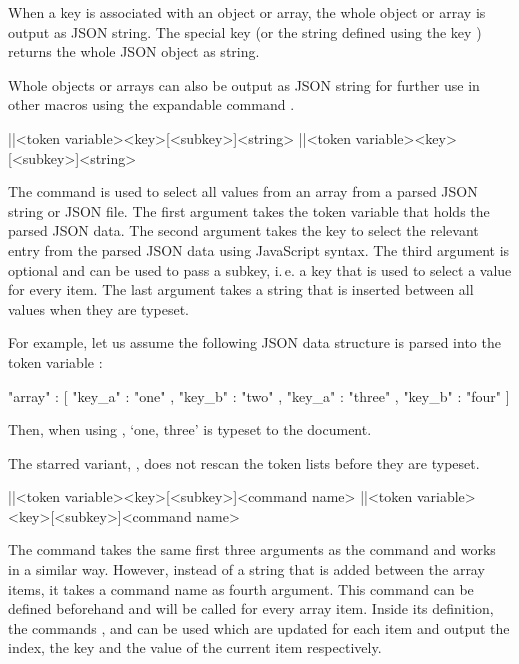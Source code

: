 \documentclass[a4paper]{article}
\begin{document}
{{When a key is associated with an object or array, the whole object or array is output as JSON string. The special key  (or the string defined using the key ) returns the whole JSON object as string. 

Whole objects or arrays can also be output as JSON string for further use in other macros using the expandable command \macro{\JSONParseExpandableValue}. 

\begin{macrodef}
|\JSONParseArrayValues|{<token variable>}{<key>}[<subkey>]{<string>}
|\JSONParseArrayValues*|{<token variable>}{<key>}[<subkey>]{<string>}
\end{macrodef}
The command \macro{\JSONParseArrayValues} is used to select all values from an array from a parsed JSON string or JSON file. The first argument takes the token variable that holds the parsed JSON data. The second argument takes the key to select the relevant entry from the parsed JSON data using JavaScript syntax. The third argument is optional and can be used to pass a subkey, i.\,e. a key that is used to select a value for every item. The last argument takes a string that is inserted between all values when they are typeset.

For example, let us assume the following JSON data structure is parsed into the token variable \macro{\myJSONdata}:

\begin{codeexample}
{
  "array" : [
    {
      "key_a" : "one" ,
      "key_b" : "two"
    } ,
    {
      "key_a" : "three" ,
      "key_b" : "four"
    }
  ]
}
\end{codeexample}

Then, when using , `one, three' is typeset to the document. 

The starred variant, \macro{\JSONParseArrayValues*}, does not rescan the token lists before they are typeset. 

\begin{macrodef}
|\JSONParseArrayValuesMap|{<token variable>}{<key>}[<subkey>]{<command name>}
|\JSONParseArrayValuesMap*|{<token variable>}{<key>}[<subkey>]{<command name>}
\end{macrodef}
The command \macro{\JSONParseArrayValuesMap} takes the same first three arguments as the command \macro{\JSONParseArrayValues} and works in a similar way. However, instead of a string that is added between the array items, it takes a command name as fourth argument. This command can be defined beforehand and will be called for every array item. Inside its definition, the commands \macro{\JSONParseArrayIndex}, \macro{\JSONParseArrayKey} and \macro{\JSONParseArrayValue} can be used which are updated for each item and output the index, the key and the value of the current item respectively. 

}}
\end{document}
